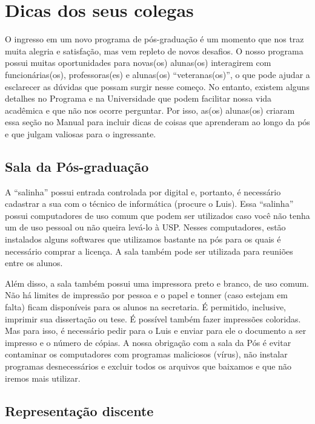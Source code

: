 \chapter[Dicas dos alunos]{Dicas dos seus colegas}

O ingresso em um novo programa de pós-graduação é um momento que nos
traz muita alegria e satisfação, mas vem repleto de novos desafios. O
nosso programa possui muitas oportunidades para novas(os) alunas(os)
interagirem com funcionárias(os), professoras(es) e alunas(os)
``veteranas(os)'', o que pode ajudar a esclarecer as dúvidas que possam
surgir nesse começo. No entanto, existem alguns detalhes no Programa e
na Universidade que podem facilitar nossa vida acadêmica e que não nos
ocorre perguntar. Por isso, as(os) alunas(os) criaram essa seção
no Manual para incluir dicas de coisas que aprenderam ao longo
da pós e que julgam valiosas para o ingressante.


\section{Sala da Pós-graduação}\label{sala-da-posgraduaucao}

A ``salinha'' possui entrada controlada por digital e, portanto, é
necessário cadastrar a sua com o técnico de informática (procure o
Luis). Essa ``salinha'' possui computadores de uso comum que podem
ser utilizados caso você não tenha um de uso pessoal ou não queira
levá-lo à USP. Nesses computadores, estão instalados alguns softwares
que utilizamos bastante na pós para os quais é necessário comprar a
licença. A sala também pode ser utilizada para reuniões entre os
alunos.

Além disso, a sala também possui uma impressora preto e branco, de uso
comum. Não há limites de impressão por pessoa e o papel e tonner (caso
estejam em falta) ficam disponíveis para os alunos na secretaria. É
permitido, inclusive, imprimir sua dissertação ou tese. É possível
também fazer impressões coloridas. Mas para isso, é necessário pedir
para o Luis e enviar para ele o documento a ser impresso e o número de
cópias. A nossa obrigação com a sala da Pós é evitar contaminar os
computadores com programas maliciosos (vírus), não instalar programas desnecessários e excluir
todos os arquivos que baixamos e que não iremos mais utilizar.


\section{Representação discente}\label{representacao-discente}

